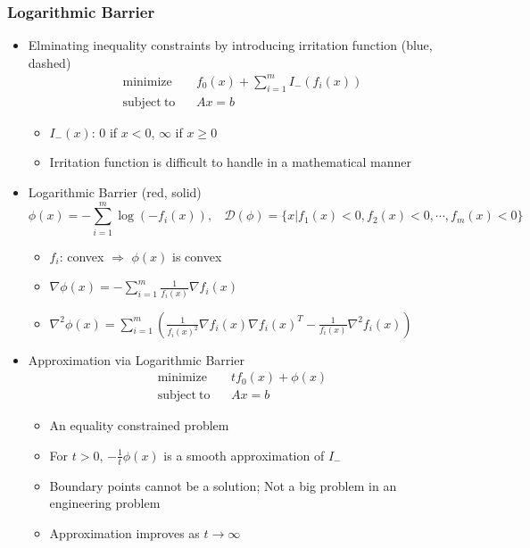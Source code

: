 \subsubsection*{Logarithmic Barrier}
\begin{itemize}
    \item Elminating inequality constraints by introducing irritation function (blue, dashed)
        $$ \begin{aligned}
            \mathrm{minimize}~~&~~f_0(x)+\sum_{i=1}^mI_-(f_i(x)) \\
            \mathrm{subject~to}~~&~~Ax=b
        \end{aligned} $$
    \begin{itemize}
        \item $I_-(x)$: $0$ if $x<0$, $\infty$ if $x\geq 0$
        \item Irritation function is difficult to handle in a mathematical manner
    \end{itemize}
    \item Logarithmic Barrier (red, solid)
        $$ \phi(x)=-\sum_{i=1}^m\log(-f_i(x)),~~~~\mathcal{D}(\phi)=\{x|f_1(x)<0,f_2(x)<0,\cdots,f_m(x)<0\} $$
    \begin{itemize}
        \item $f_i$: convex $\Rightarrow$ $\phi(x)$ is convex
        \item $\nabla\phi(x)=-\sum_{i=1}^{m}\frac{1}{f_i(x)}\nabla f_i(x)$
        \item $\nabla^2\phi(x)=\sum_{i=1}^{m}\left(\frac{1}{f_i(x)^2}\nabla f_i(x)\nabla f_i(x)^T-\frac{1}{f_i(x)}\nabla^2f_i(x)\right)$
    \end{itemize}
    \item Approximation via Logarithmic Barrier
        $$ \begin{aligned}
            \mathrm{minimize}~~&~~tf_0(x)+\phi(x) \\
            \mathrm{subject~to}~~&~~Ax=b
        \end{aligned} $$
    \begin{itemize}
        \item An equality constrained problem
        \item For $t>0$, $-\frac{1}{t}\phi(x)$ is a smooth approximation of $I_-$
        \item Boundary points cannot be a solution; Not a big problem in an engineering problem
        \item Approximation improves as $t\rightarrow\infty$
    \end{itemize}
    \begin{figures}
    \end{figures}
\end{itemize}

